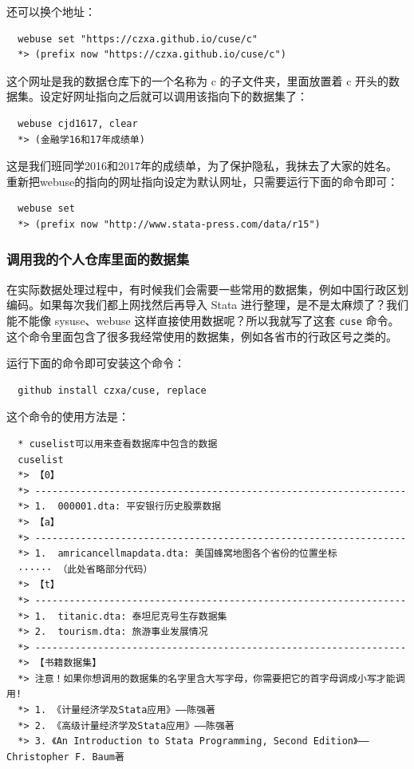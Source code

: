 \documentclass[cn,fancy,blue,11pt]{elegantbook}
\begin{document}
还可以换个地址：

\begin{lstlisting}
  webuse set "https://czxa.github.io/cuse/c"
  *> (prefix now "https://czxa.github.io/cuse/c")
\end{lstlisting}

这个网址是我的数据仓库下的一个名称为 c 的子文件夹，里面放置着 c 开头的数据集。设定好网址指向之后就可以调用该指向下的数据集了：

\begin{lstlisting}
  webuse cjd1617, clear
  *> (金融学16和17年成绩单)
\end{lstlisting}

这是我们班同学2016和2017年的成绩单，为了保护隐私，我抹去了大家的姓名。
重新把webuse的指向的网址指向设定为默认网址，只需要运行下面的命令即可：

\begin{lstlisting}
  webuse set
  *> (prefix now "http://www.stata-press.com/data/r15")
\end{lstlisting}

\subsubsection{调用我的个人仓库里面的数据集}
在实际数据处理过程中，有时候我们会需要一些常用的数据集，例如中国行政区划编码。如果每次我们都上网找然后再导入 Stata 进行整理，是不是太麻烦了？我们能不能像 sysuse、webuse 这样直接使用数据呢？所以我就写了这套 \lstinline{cuse} 命令。这个命令里面包含了很多我经常使用的数据集，例如各省市的行政区号之类的。

运行下面的命令即可安装这个命令：

\begin{lstlisting}
  github install czxa/cuse, replace
\end{lstlisting}

这个命令的使用方法是：

\begin{lstlisting}
  * cuselist可以用来查看数据库中包含的数据
  cuselist
  *> 【0】
  *> -----------------------------------------------------------------
  *> 1.  000001.dta: 平安银行历史股票数据
  *> 【a】
  *> -----------------------------------------------------------------
  *> 1.  amricancellmapdata.dta: 美国蜂窝地图各个省份的位置坐标
  ······ （此处省略部分代码）
  *> 【t】
  *> -----------------------------------------------------------------
  *> 1.  titanic.dta: 泰坦尼克号生存数据集
  *> 2.  tourism.dta: 旅游事业发展情况
  *> -----------------------------------------------------------------
  *> 【书籍数据集】
  *> 注意！如果你想调用的数据集的名字里含大写字母，你需要把它的首字母调成小写才能调用!
  *> 1. 《计量经济学及Stata应用》——陈强著
  *> 2. 《高级计量经济学及Stata应用》——陈强著
  *> 3. 《An Introduction to Stata Programming, Second Edition》——Christopher F. Baum著
\end{lstlisting}
\end{document}
